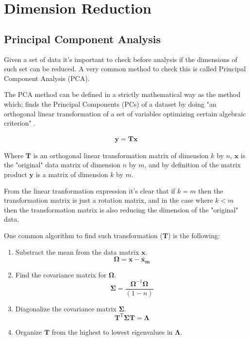 \chapter{Dimension Reduction}
\label{pca}

\section{Principal Component Analysis}
Given  a set  of data  it's important  to check  before analysis  if the
dimensions of such  set can be reduced. A very  common method to check
this is called Principal Component Analysis (PCA).

The PCA  method can be defined  in a strictly mathematical way as the
method which; finds the Principal  Components (PCs) of  a dataset by
doing  "an orthogonal  linear  transformation of  a  set of  variables
optimizing certain algebraic criterion" \cite{jolliffe2002}.

\begin{gather}
  \mathbf{y} = \mathbf{T} \mathbf{x}
\end{gather}

Where $\mathbf{T}$ is an orthogonal linear transformation matrix of
dimension $k$ by $n$, $\mathbf{x}$ is the "original" data matrix of
dimension $n$ by $m$, and by definition of the matrix product
$\mathbf{y}$ is a matrix of dimension $k$ by $m$.

From the linear tranformation expression it's clear that if $k=m$ then
the transformation matrix is just a rotation matrix, and in the case
where $k<m$ then the transformation matrix is also reducing the
dimension of the "original" data.

One common algorithm to find such transformation ($\mathbf{T}$) is the
following: 

\begin{enumerate}
\item{Substract the mean from the data matrix $\mathbf{x}$.
\begin{equation}
\mathbf{\Omega} = \mathbf{x} - \mathbf{\bar{x}_{m}}
\end{equation}
}
\item{Find the covariance matrix for $\mathbf{\Omega}$.
\begin{equation}
\mathbf{\Sigma} = \frac{\mathbf{\Omega}^{-1} \mathbf{\Omega}}{(1-n)}
\end{equation}  
}  
\item{Diagonalize the covariance matrix $\mathbf{\Sigma}$.
\begin{equation}
\mathbf{T}^{\mathrm{T}} \mathbf{\Sigma} \mathbf{T} = \mathbf{\Lambda}
\end{equation}  
}  
\item{Organize $\mathbf{T}$ from the highest to lowest eigenvalues in
$\mathbf{\Lambda}$.}
\end{enumerate}  

